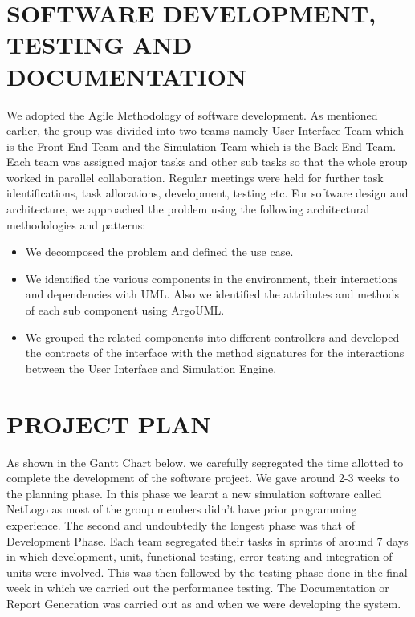 \documentclass[11pt,a4paper]{article}
\begin{document}
\section{SOFTWARE DEVELOPMENT, TESTING AND DOCUMENTATION}

We adopted the Agile Methodology of software development. As mentioned earlier, the group was divided into two teams namely User Interface Team which is the Front End Team and the Simulation Team which is the Back End Team. Each team was assigned major tasks and other sub tasks so that the whole group worked in parallel collaboration. Regular meetings were held for further task identifications, task allocations, development, testing etc.\newline
For software design and architecture, we approached the problem using the following architectural methodologies and patterns:
\begin{itemize}
\item We decomposed the problem and defined the use case. 
\item We identified the various components in the environment, their interactions and dependencies with UML. Also we identified the attributes and methods of each sub component using ArgoUML. 
\item We grouped the related components into different controllers and developed the contracts of the interface with the method signatures for the interactions between the User Interface and Simulation Engine.
\end{itemize}

\section{PROJECT PLAN}

As shown in the Gantt Chart below, we carefully segregated the time allotted to complete the development of the software project. We gave around 2-3 weeks to the planning phase. In this phase we learnt a new simulation software called NetLogo as most of the group members didn’t have prior programming experience. The second and undoubtedly the longest phase was that of Development Phase. Each team segregated their tasks in sprints of around 7 days in which development, unit, functional testing, error testing and integration of units were involved. This was then followed by the testing phase done in the final week in which we carried out the performance testing. The Documentation or Report Generation was carried out as and when we were developing the system.
\end{document}
